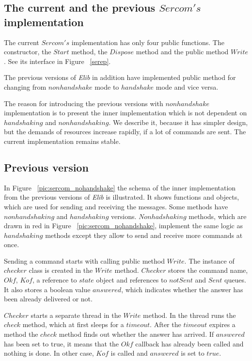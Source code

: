 \documentclass[12pt,notitlepage]{report}
\begin{document}
\subsection{The current and the previous $Sercom's$ implementation}\label{sec:versions}
	The current $Sercom's$ implementation has only four public functions.
	The constructor, the $Start$ method, the $Dispose$ method and the public method $Write$. 
	See its interface in Figure ~\ref{serep}.	

	The previous versions of {\it Elib} in addition have implemented public method for changing from $nonhandshake$ mode to 
	$handshake$ mode and vice versa.

	The reason for introducing the previous versions with $nonhandshake$ implementation is to present 
	the inner implementation which is not dependent on $handshaking$ and $nonhandshaking$.
	We describe it, because it has simpler design, but the demands of resources increase rapidly, if a lot of commands are sent.
	The current implementation remains stable.
\subsection*{Previous version}\label{previous}
	In  Figure ~\ref{pic:sercom_nohandshake} the schema of the inner implementation 
	from the previous versions of {\it Elib} is illustrated.
	It shows functions and objects, which are used for sending and receiving the messages.
	Some methods have $nonhandshaking$ and $handshaking$ versions.
	$Nonhadshaking$ methods, which are drawn in red	in Figure ~\ref{pic:sercom_nohandshake}, implement the same logic 
	as $handshaking$ methods except they allow to send and receive more commands
	at once.

	
	Sending a command starts with calling public method $Write$. The instance of $checker$ class is created in the $Write$ method.
	$Checker$ stores the command name, $Okf$, $Kof$, a reference to $state$ object and references to $notSent$ 
	and $Sent$ queues.
	It also stores a boolean value $answered$, which indicates whether the answer has been already delivered or not.

	$Checker$ starts a separate thread in the $Write$ method. In the thread runs the $check$ method, which at first sleeps for a $timeout$.
	After the $timeout$ expires a method the $check$ method finds out whether the answer has arrived.
	If $answered$ has been set to true, it means that the $Okf$ callback has already been 
	called and nothing is done. In other case, $Kof$ is called and $answered$ is set to $true$.
\end{document}
